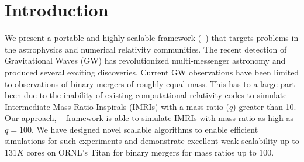 \documentclass[10pt, conference]{IEEEtran} %
\begin{document}

%
\IEEEpeerreviewmaketitle

\section{Introduction}
We present a portable and highly-scalable framework (\dendrogr~) that targets problems in the astrophysics and numerical relativity communities.
The recent detection of Gravitational Waves (GW) has revolutionized  multi-messenger astronomy and produced several exciting discoveries. Current GW observations have been limited to observations of binary mergers of roughly equal mass. This has to a large part been due to the inability of existing computational relativity codes to simulate Intermediate Mass Ratio Inspirals (IMRIs) with a mass-ratio ($q$) greater than 10. Our approach, \dendrogr~ framework is able to simulate IMRIs with mass ratio as high as $q=100$.
We have designed novel scalable algorithms to enable efficient simulations for such experiments and demonstrate excellent weak scalability up to $131K$ cores on ORNL's Titan for binary mergers for mass ratios up to $100$. 

\end{document}
